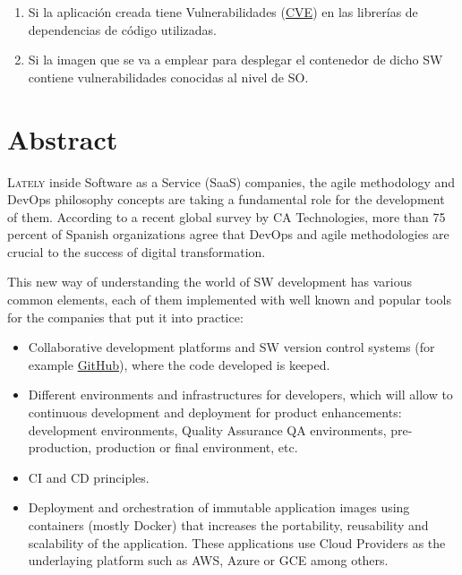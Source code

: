 \begin{enumerate}
	\item Si la aplicación creada tiene Vulnerabilidades (\href{https://cve.mitre.org/}{\gls{CVE}}) en las librerías de dependencias de código utilizadas.
	\item Si la imagen que se va a emplear para desplegar el contenedor de dicho \gls{SW} contiene vulnerabilidades conocidas al nivel de \gls{SO}.
\end{enumerate}


\chapter*{Abstract}
\pagestyle{especial}
{}

\lettrine[lraise=-0.1, lines=2, loversize=0.2]{L}{ately} inside Software as a Service (\gls{SaaS}) companies, the agile methodology and \gls{DevOps} philosophy concepts are taking a fundamental role for the development of them\cite{consultorit2017}. According to a recent global survey by CA Technologies, more than 75 percent of Spanish organizations agree that DevOps and agile methodologies are crucial to the success of digital transformation\cite{catechnologies2017}.

This new way of understanding the world of \gls{SW} development has various common elements, each of them implemented with well known and popular tools for the companies that put it into practice:

\begin{itemize}
\item Collaborative development platforms and \gls{SW} version control systems (for example \href{https://github.com/}{GitHub}), where the code developed is keeped.
\item Different environments and infrastructures for developers, which will allow to continuous development and deployment for product enhancements: development environments, Quality Assurance \gls{QA} environments, pre-production, production or final environment, etc.
\item \gls{CI} and \gls{CD} principles.
\item Deployment and orchestration of immutable application images using containers (mostly Docker) that increases the portability, reusability and scalability of the application. These applications use Cloud Providers as the underlaying platform such as AWS, Azure or GCE among others.
\end{itemize}

